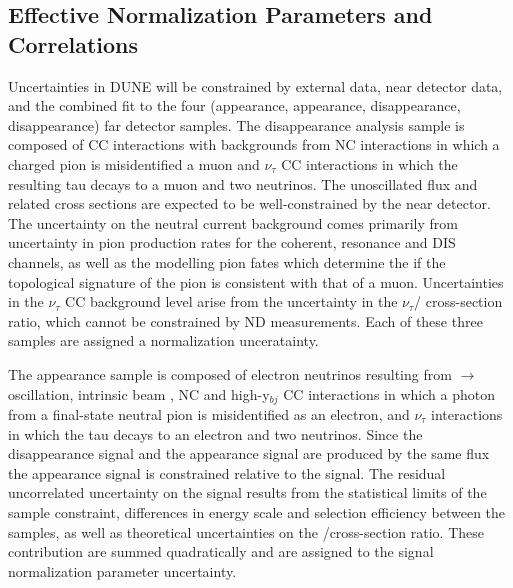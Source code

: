 \subsection{Effective Normalization Parameters and Correlations}
\label{sec:syst_just}
Uncertainties in DUNE will be constrained by external data, near detector data, and the combined
fit to the four (\nue appearance, \anue appearance, \numu disappearance, \anumu disappearance) far detector samples.
The \numu disappearance analysis sample is composed of \numu CC interactions with backgrounds from NC
interactions in which a charged pion is misidentified a muon and $\nu_{\tau}$ CC interactions in which the resulting
tau decays to a muon and two neutrinos.
The unoscillated \numu flux and related cross sections are expected to be well-constrained by the near detector.
The uncertainty on the neutral current background comes primarily from uncertainty in pion production rates
for the coherent, resonance and DIS channels, as well as the modelling pion fates which determine the 
if the topological signature of the pion is consistent with that of a muon. 
Uncertainties in the $\nu_{\tau}$ CC background level arise from the uncertainty in the $\nu_{\tau}$/\numu
cross-section ratio, which cannot be constrained by ND measurements. Each of these three samples are
assigned a normalization unceratainty. 

The \nue appearance sample is composed of electron neutrinos resulting from \numu$\rightarrow$\nue oscillation,
intrinsic beam \nue, NC and high-y$_{bj}$ \numu CC interactions in which a photon from a final-state neutral pion is
misidentified as an electron, and $\nu_{\tau}$ interactions in which the tau decays to an electron and
two neutrinos. Since the
\numu disappearance signal and the \nue appearance signal are produced by the same flux
the \nue appearance signal is constrained relative to the \numu
signal. The residual uncorrelated uncertainty on the \nue signal results from the statistical limits of the \numu sample
constraint, differences in energy scale and selection efficiency between the samples,
as well as theoretical uncertainties on the \nue/\numu cross-section ratio. These contribution are summed
quadratically and are assigned to the \nue signal normalization parameter uncertainty. 

